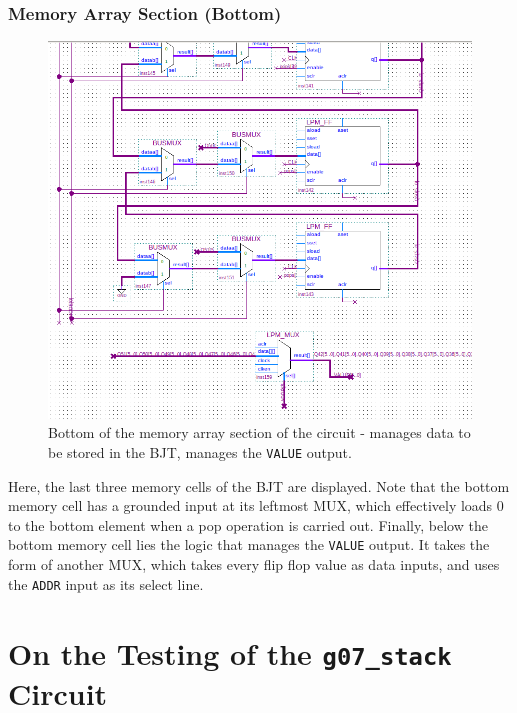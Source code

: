 \documentclass[12pt]{report}
\begin{document}
\section*{Memory Array Section (Bottom)}
\begin{figure}[h]
	\begin{center}
		\caption{Bottom of the memory array section of the circuit - manages data to be stored in the
			BJT, manages the \texttt{VALUE} output.}
		\includegraphics[scale=0.6]{Lab3/stack_array2}
	\end{center}
\end{figure}
Here, the last three memory cells of the BJT are displayed. Note that the bottom memory cell has a
grounded input at its leftmost MUX, which effectively loads 0 to the bottom element when a pop
operation is carried out. Finally, below the bottom memory cell lies the logic that manages the
\texttt{VALUE} output. It takes the form of another MUX, which takes every flip flop value as data
inputs, and uses the \texttt{ADDR} input as its select line.
\part{On the Testing of the \texttt{g07\_stack} Circuit}
\end{document}

